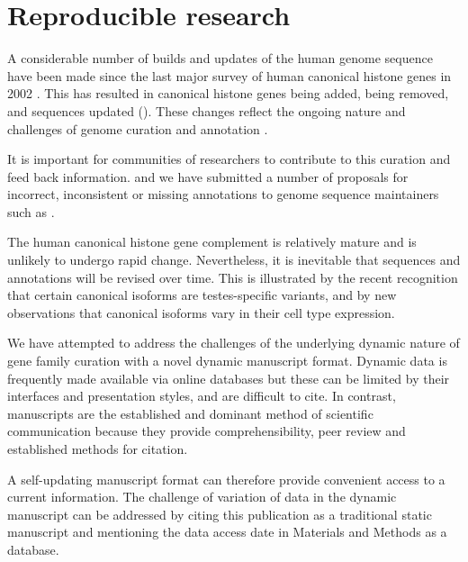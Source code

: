 \section{Reproducible research}
\label{sec:reproducible}

	A considerable number of builds and updates of the human genome sequence have been made 
	since the last major survey of human canonical histone genes in 2002 \citep{Marzluff02}.
	This has resulted in  canonical histone genes being added, 
	 being removed, 
	and  sequences updated ().
	These changes reflect the ongoing nature and challenges of genome curation and annotation \citep{BorkKoonin1998}.

	It is important for communities of researchers 
	to contribute to this curation and feed back information. 
	and we have submitted a number of proposals 
	for incorrect, inconsistent or missing annotations
	to genome sequence maintainers such as . 

	The human canonical histone gene complement is relatively mature and is unlikely to undergo rapid change.
	Nevertheless, it is inevitable that sequences and annotations will be revised over time. 
	This is illustrated by the recent recognition that certain canonical isoforms are testes-specific variants, 
	and by new observations that canonical isoforms vary in their cell type expression. 

	We have attempted to address the challenges of the underlying dynamic nature of 
	gene family curation with a novel dynamic manuscript format.
	Dynamic data is frequently made available via online databases
	but these can be limited by their interfaces and presentation styles, and are difficult to cite.
	In contrast, manuscripts are the established and dominant method of scientific communication
	because they provide comprehensibility, peer review and established methods for citation.

	A self-updating manuscript format can therefore provide convenient access to a current information.
	The challenge of variation of data in the dynamic manuscript can be addressed by
	citing this publication as a traditional static manuscript 
	and mentioning the data access date in Materials and Methods as a database.

